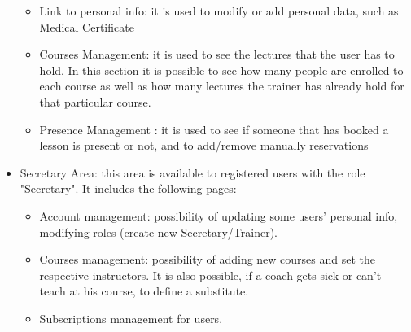 \begin{itemize}
	\begin{itemize}
		\item Link to personal info: it is used to modify or add personal data, such as Medical Certificate
		\item Courses Management: it is used to see the lectures that the user has to hold. In this section it is possible to see how many people are enrolled to each course as well as how many lectures the trainer has already hold for that particular course.
		\item Presence Management : it is used to see if someone that has booked a lesson is present or not, and to add/remove manually reservations
	\end{itemize}
	\item Secretary Area: this area is available to registered users with the role "Secretary".
	It includes the following pages:
	\begin{itemize}
		\item Account management: possibility of updating some users' personal info, modifying roles (create new Secretary/Trainer).
		\item Courses management: possibility of adding new courses and set the respective instructors. It is also possible, if a coach gets sick or can't teach at his course, to define a substitute.
		\item Subscriptions management for users.
	\end{itemize}
\end{itemize}
